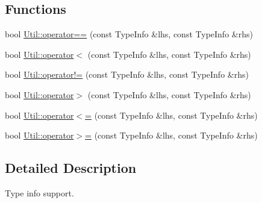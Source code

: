 \subsection*{Functions}
\begin{DoxyCompactItemize}
\item 
bool \mbox{\hyperlink{namespaceUtil_a2d346e60a99268ba998a5a2daf20ab12}{Util\+::operator==}} (const Type\+Info \&lhs, const Type\+Info \&rhs)
\item 
bool \mbox{\hyperlink{namespaceUtil_a25f804a3db6eff35e4a4aa1f805be414}{Util\+::operator$<$}} (const Type\+Info \&lhs, const Type\+Info \&rhs)
\item 
bool \mbox{\hyperlink{namespaceUtil_a84dc32b571d9f688b794f8b9ba420e56}{Util\+::operator!=}} (const Type\+Info \&lhs, const Type\+Info \&rhs)
\item 
bool \mbox{\hyperlink{namespaceUtil_aa36c7338b4d071f888e50c951d0594f4}{Util\+::operator$>$}} (const Type\+Info \&lhs, const Type\+Info \&rhs)
\item 
bool \mbox{\hyperlink{namespaceUtil_a42a6d3e64e27ce826387a74b547a486a}{Util\+::operator$<$=}} (const Type\+Info \&lhs, const Type\+Info \&rhs)
\item 
bool \mbox{\hyperlink{namespaceUtil_afc603e9af4a3169c07212d563c33862c}{Util\+::operator$>$=}} (const Type\+Info \&lhs, const Type\+Info \&rhs)
\end{DoxyCompactItemize}


\subsection{Detailed Description}
Type info support. 

